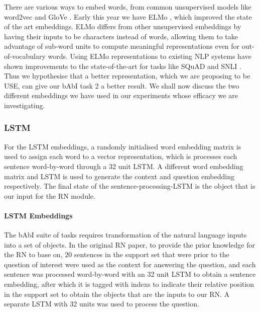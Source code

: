 \documentclass{article}
\begin{document}
There are various ways to embed words, from common unsupervised models like word2vec \cite{word2vec} and GloVe \cite{pennington2014glove}. Early this year we have ELMo \cite{N18-1202}, which improved the state of the art embeddings. ELMo differs from other unsupervised embeddings by having their inputs to be characters instead of words, allowing them to take advantage of sub-word units to compute meaningful representations even for out-of-vocabulary words. Using ELMo representations to existing NLP systems have shown improvements to the state-of-the-art for tasks like SQuAD \cite{RajpurkarZLL16} and SNLI \cite{snli:emnlp2015}. Thus we hypothesise that a better representation, which we are proposing to be USE, can give our bAbI task 2 a better result. We shall now discuss the two different embeddings we have used in our experiments whose efficacy we are investigating.






\subsubsection{LSTM}
For the LSTM embeddings, a randomly initialised word embedding matrix is used to assign each word to a vector representation, which is processes each sentence word-by-word through a 32 unit LSTM. A different word embedding matrix and LSTM is used to generate the context and question embedding respectively. The final state of the sentence-processing-LSTM is the object that is our input for the RN module.

\paragraph{LSTM Embeddings}

The bAbI suite of tasks requires transformation of the natural language inputs into a set of objects. In the original RN paper, to provide the prior knowledge for the RN to base on, 20 sentences in the support set that were prior to the question of interest were used as the context for answering the question, and each sentence was processed word-by-word with an 32 unit LSTM to obtain a sentence embedding, after which it is tagged with indexs to indicate their relative position in the support set to obtain the objects that are the inputs to our RN. A separate LSTM with 32 units was used to process the question. 
\end{document}

